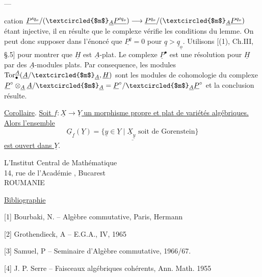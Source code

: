 \begin{center}----\end{center}

cation $\underline{P'^{q_o}}/(\textcircled{$m$}_{\underline A}\underline{P'^{q_o}})\longrightarrow\underline{P^{q_o}}/(\textcircled{$m$}_{\underline A}\underline{P^{q_o}})$ étant injective, il en résulte que le complexe
vérifie les conditions du lemme. On peut donc supposer dans l'énoncé que $\underline{P^q}=0$ pour $\underline q>\underline q_{\underline o}$. Utilisons [(1), Ch.III, §.5] pour montrer que $\underline H$ est $\underline A$-plat. Le complexe $\underline P^\bullet$ est une résolution pour $\underline H$ par des $\underline A$-modules plats. Par consequence, les modules $\operatorname{Tor}^{\underline A}_{\bullet}(\underline A/\textcircled{$m$}_{\underline A},\underline H)$ sont les modules de cohomologie du complexe $\underline P^\circ\otimes_{\underline A}\underline A/\textcircled{$m$}_{\underline A}=\underline P^\circ/\textcircled{$m$}_{\underline A}\underline P^\circ$ et la conclusion résulte.

\uline{Corollaire}. \uline{Soit $\underline f:\underline X\longrightarrow\underline Y$ un morphisme propre et plat de variétés algébriques. Alors l'ensemble}
\[
\underline{\underline G_{\underline f}(\underline Y)=\{\underline y\in\underline Y\mid\underline X_{\underline y}\text{ soit de Gorenstein}\}}
\]
\uline{est ouvert dans $\underline Y$}.

\begin{flushright}
L'Institut Central de Mathématique\\
14, rue de l'Académie , Bucarest\\
ROUMANIE
\end{flushright}


\uline{Bibliographie}

[1] Bourbaki, N. -- Algèbre commutative, Paris, Hermann 

[2] Grothendieck, A -- E.G.A., IV, 1965

[3] Samuel, P -- Seminaire d'Algèbre commutative, 1966/67.

[4] J. P. Serre -- Faisceaux algébriques cohérents, Ann. Math. 1955
